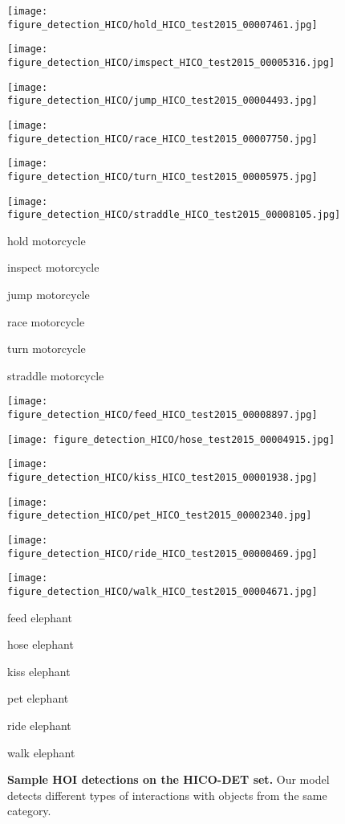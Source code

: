\documentclass{bmvc2k}
\newlength\figmargin
\newlength\figbmargin
\newcommand{\mpage}[2]
{
\begin{minipage}{#1\linewidth}\centering
#2
\end{minipage}
}
\begin{document}
 \begin{figure*}[t]
\centering
\footnotesize


\mpage{0.155}{\texttt{[image: figure\_detection\_HICO/hold\_HICO\_test2015\_00007461.jpg]}}\hfill
\mpage{0.155}{\texttt{[image: figure\_detection\_HICO/imspect\_HICO\_test2015\_00005316.jpg]}}\hfill
\mpage{0.155}{\texttt{[image: figure\_detection\_HICO/jump\_HICO\_test2015\_00004493.jpg]}}\hfill
\mpage{0.155}{\texttt{[image: figure\_detection\_HICO/race\_HICO\_test2015\_00007750.jpg]}}\hfill
\mpage{0.155}{\texttt{[image: figure\_detection\_HICO/turn\_HICO\_test2015\_00005975.jpg]}}\hfill
\mpage{0.155}{\texttt{[image: figure\_detection\_HICO/straddle\_HICO\_test2015\_00008105.jpg]}}\hfill

\mpage{0.155}{\scriptsize hold       motorcycle}\hfill
\mpage{0.155}{\scriptsize inspect       motorcycle}\hfill
\mpage{0.155}{\scriptsize jump       motorcycle}\hfill
\mpage{0.155}{\scriptsize race       motorcycle}\hfill
\mpage{0.155}{\scriptsize turn       motorcycle}\hfill
\mpage{0.155}{\scriptsize straddle   motorcycle}\hfill

\mpage{0.155}{\texttt{[image: figure\_detection\_HICO/feed\_HICO\_test2015\_00008897.jpg]}}\hfill
\mpage{0.155}{\texttt{[image: figure\_detection\_HICO/hose\_test2015\_00004915.jpg]}}\hfill
\mpage{0.155}{\texttt{[image: figure\_detection\_HICO/kiss\_HICO\_test2015\_00001938.jpg]}}\hfill
\mpage{0.155}{\texttt{[image: figure\_detection\_HICO/pet\_HICO\_test2015\_00002340.jpg]}}\hfill
\mpage{0.155}{\texttt{[image: figure\_detection\_HICO/ride\_HICO\_test2015\_00000469.jpg]}}\hfill
\mpage{0.155}{\texttt{[image: figure\_detection\_HICO/walk\_HICO\_test2015\_00004671.jpg]}}\hfill

\mpage{0.155}{\scriptsize feed       elephant}\hfill
\mpage{0.155}{\scriptsize hose       elephant}\hfill
\mpage{0.155}{\scriptsize kiss       elephant}\hfill
\mpage{0.155}{\scriptsize pet       elephant}\hfill
\mpage{0.155}{\scriptsize ride       elephant}\hfill
\mpage{0.155}{\scriptsize walk       elephant}\hfill


\vspace{\figmargin}
\caption{\textbf{Sample HOI detections on the HICO-DET  set.} Our model detects different types of interactions with objects from the same category.
}
\vspace{\figbmargin}
\label{fig:one_object}
\end{figure*} \begin{figure*}[t]
\centering





\end{figure*}
\end{document}

